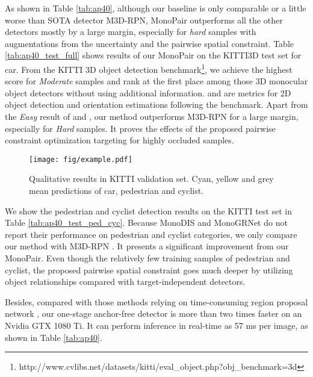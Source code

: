 \documentclass[10pt,twocolumn,letterpaper]{article}
\begin{document}
As shown in Table \ref{tab:ap40}, although our baseline is only comparable or a little worse than SOTA detector M3D-RPN, MonoPair outperforms all the other detectors mostly by a large margin, especially for \textit{hard} samples with augmentations from the uncertainty and the pairwise spatial constraint.
Table \ref{tab:ap40_test_full} shows results of our MonoPair on the KITTI3D test set for car. From the KITTI 3D object detection benchmark\footnote{http://www.cvlibs.net/datasets/kitti/eval\_object.php?obj\_benchmark=3d}, we achieve the highest score for \textit{Moderate} samples and rank at the first place among those 3D monocular object detectors without using additional information.  and  are metrics for 2D object detection and orientation estimations following the benchmark. Apart from the \textit{Easy} result of  and , our method outperforms M3D-RPN for a large margin, especially for \textit{Hard} samples. It proves the effects of the proposed pairwise constraint optimization targeting for highly occluded samples.



\begin{figure*}[!ht]
	\begin{center}
		\hspace{0cm}
		\texttt{[image: fig/example.pdf]}
	\end{center}
\caption{Qualitative results in KITTI validation set. Cyan, yellow and grey mean predictions of car, pedestrian and cyclist.}
	\label{fig:qualitive}
\end{figure*}

We show the pedestrian and cyclist detection results on the KITTI test set in Table \ref{tab:ap40_test_ped_cyc}.
Because MonoDIS \cite{simonelli_disentangling_2019} and MonoGRNet \cite{qin_monogrnet_2018} do not report their performance on pedestrian and cyclist categories, we only compare our method with M3D-RPN \cite{brazil_m3d_rpn_2019}. It presents a significant improvement from our MonoPair. Even though the relatively few training samples of pedestrian and cyclist, the proposed pairwise spatial constraint goes much deeper by utilizing object relationships compared with target-independent detectors.



Besides, compared with those methods relying on time-consuming region proposal network \cite{brazil_m3d_rpn_2019, simonelli_disentangling_2019}, our one-stage anchor-free detector is more than two times faster on an Nvidia GTX 1080 Ti. It can perform inference in real-time as 57 ms per image, as shown in Table \ref{tab:ap40}.
\end{document}
